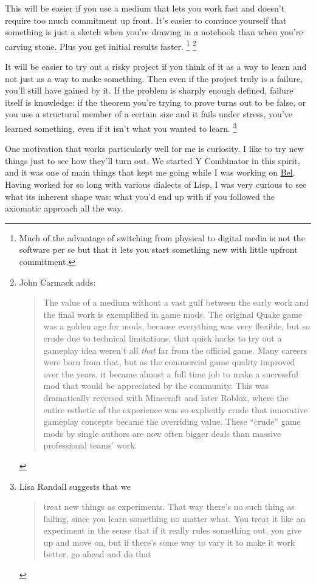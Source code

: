 This will be easier if you use a medium that lets you work fast and
doesn't require too much commitment up front. It's easier to convince
yourself that something is just a sketch when you're drawing in a
notebook than when you're carving stone. Plus you get initial results
faster. \footnote{Much of the advantage of switching from physical to digital
media is not the software per se but that it lets you start something
new with little upfront commitment.} \footnote{John Carmack adds:

\begin{quote}
The value of a medium without a vast gulf between the early work and the
final work is exemplified in game mods. The original Quake game was a
golden age for mods, because everything was very flexible, but so crude
due to technical limitations, that quick hacks to try out a gameplay
idea weren't all \emph{that} far from the official game. Many careers
were born from that, but as the commercial game quality improved over
the years, it became almost a full time job to make a successful mod
that would be appreciated by the community. This was dramatically
reversed with Minecraft and later Roblox, where the entire esthetic of
the experience was so explicitly crude that innovative gameplay concepts
became the overriding value. These ``crude'' game mods by single authors
are now often bigger deals than massive professional teams' work.
\end{quote}}

It will be easier to try out a risky project if you think of it as a way
to learn and not just as a way to make something. Then even if the
project truly is a failure, you'll still have gained by it. If the
problem is sharply enough defined, failure itself is knowledge: if the
theorem you're trying to prove turns out to be false, or you use a
structural member of a certain size and it fails under stress, you've
learned something, even if it isn't what you wanted to learn.
\footnote{Lisa Randall suggests that we

\begin{quote}
treat new things as experiments. That way there's no such thing as
failing, since you learn something no matter what. You treat it like an
experiment in the sense that if it really rules something out, you give
up and move on, but if there's some way to vary it to make it work
better, go ahead and do that
\end{quote}}

One motivation that works particularly well for me is curiosity. I like
to try new things just to see how they'll turn out. We started Y
Combinator in this spirit, and it was one of main things that kept me
going while I was working on \href{bel.html}{Bel}. Having worked for so
long with various dialects of Lisp, I was very curious to see what its
inherent shape was: what you'd end up with if you followed the axiomatic
approach all the way.

